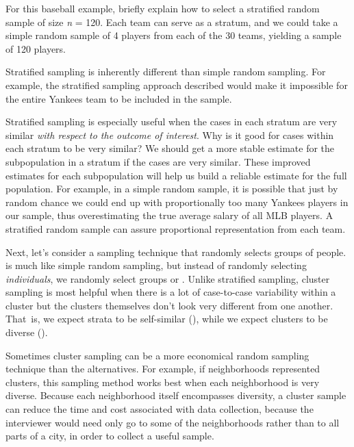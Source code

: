 \begin{examplewrap}
\begin{nexample}{For this baseball example, briefly explain how to select a stratified random sample of size \textit{n} = 120. }
Each team can serve as a stratum, and we could take a simple random sample of 4 players from each of the 30 teams, yielding a sample of 120 players.
\end{nexample}
\end{examplewrap}

Stratified sampling is inherently different than simple random sampling. For example, the stratified sampling approach described would make it impossible for the entire Yankees team to be included in the sample.

\begin{examplewrap}
\begin{nexample}{Stratified sampling is especially useful when the cases in each stratum are very similar \emph{with respect to the outcome of interest}. Why is it good for cases within each stratum to be very similar?}
We should get a more stable estimate for the subpopulation in a stratum if the cases are very similar. These improved estimates for each subpopulation will help us build a reliable estimate for the full population. For example, in a simple random sample, it is possible that just by random chance we could end up with proportionally too many Yankees players in our sample, thus overestimating the true average salary of all MLB players. A stratified random sample can assure proportional representation from each team.
\end{nexample}
\end{examplewrap}

Next, let's consider a sampling technique that randomly selects groups of people.  is much like simple random sampling, but instead of randomly selecting \emph{individuals}, we randomly select groups or . Unlike stratified sampling, cluster sampling is most helpful when there is a lot of case-to-case variability within a cluster but the clusters themselves don't look very different from one another. That~is, we expect strata to be self-similar (), while we expect clusters to be diverse ().

Sometimes cluster sampling can be a more economical random sampling technique than the alternatives. For example, if neighborhoods represented clusters, this sampling method works best when each neighborhood is very diverse. Because each neighborhood itself encompasses diversity, a cluster sample can reduce the time and cost associated with data collection, because the interviewer would need only go to some of the neighborhoods rather than to all parts of a city, in order to collect a useful sample.

